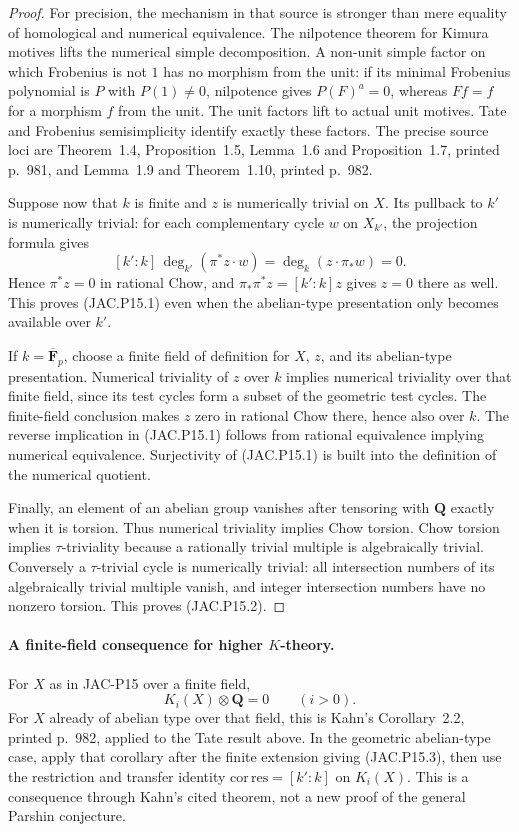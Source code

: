 \begin{proof}
For precision, the mechanism in that source is stronger than
mere equality of homological and numerical equivalence. The
nilpotence theorem for Kimura motives lifts the numerical simple
decomposition. A non-unit simple factor on which Frobenius is
not $1$ has no morphism from the unit: if its minimal Frobenius
polynomial is $P$ with $P(1)\ne0$, nilpotence gives
$P(F)^a=0$, whereas $Ff=f$ for a morphism $f$ from the unit.
The unit factors lift to actual unit motives. Tate and Frobenius
semisimplicity identify exactly these factors. The precise source
loci are Theorem~1.4, Proposition~1.5, Lemma~1.6 and
Proposition~1.7, printed p.~981, and Lemma~1.9 and
Theorem~1.10, printed p.~982.

Suppose now that $k$ is finite and $z$ is numerically trivial on
$X$. Its pullback to $k'$ is numerically trivial: for each
complementary cycle $w$ on $X_{k'}$, the projection formula gives
\[
 [k':k]\,\deg_{k'}(\pi^*z\cdot w)
       =\deg_k(z\cdot\pi_*w)=0.
\]
Hence $\pi^*z=0$ in rational Chow, and
$\pi_*\pi^*z=[k':k]z$ gives $z=0$ there as well.
This proves (JAC.P15.1) even when the abelian-type presentation
only becomes available over $k'$.

If $k=\overline{\mathbf F}_p$, choose a finite field of definition
for $X$, $z$, and its abelian-type presentation. Numerical
triviality of $z$ over $k$ implies numerical triviality over that
finite field, since its test cycles form a subset of the geometric
test cycles. The finite-field conclusion makes $z$ zero in
rational Chow there, hence also over $k$. The reverse implication
in (JAC.P15.1) follows from rational equivalence implying numerical
equivalence. Surjectivity of (JAC.P15.1) is built into the
definition of the numerical quotient.

Finally, an element of an abelian group vanishes after tensoring
with $\mathbf Q$ exactly when it is torsion. Thus numerical
triviality implies Chow torsion. Chow torsion implies
$\tau$-triviality because a rationally trivial multiple is
algebraically trivial. Conversely a $\tau$-trivial cycle is
numerically trivial: all intersection numbers of its algebraically
trivial multiple vanish, and integer intersection numbers have
no nonzero torsion. This proves (JAC.P15.2).
\end{proof}

\paragraph{A finite-field consequence for higher $K$-theory.}
For $X$ as in JAC-P15 over a finite field,
\[
                    K_i(X)\otimes\mathbf Q=0
                    \qquad(i>0).                         \tag{JAC.P15.4}
\]
For $X$ already of abelian type over that field, this is Kahn's
Corollary~2.2, printed p.~982, applied to the Tate result above.
In the geometric abelian-type case, apply that corollary after
the finite extension giving (JAC.P15.3), then use the restriction
and transfer identity $\mathrm{cor}\,\mathrm{res}=[k':k]$ on
$K_i(X)$. This is a consequence through Kahn's cited theorem,
not a new proof of the general Parshin conjecture.

